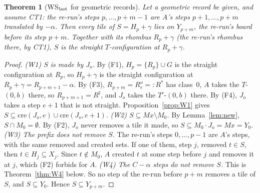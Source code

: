 \documentclass[11pt]{article}
\newtheorem{theorem}{Theorem}\newtheorem{lemma}[theorem]{Lemma}\newtheorem{proposition}[theorem]{Proposition}
\theoremstyle{definition}\newtheorem{definition}[theorem]{Definition}\newtheorem{remark}[theorem]{Remark}
\begin{document}
\begin{theorem}[WS$_{\rm last}$ for geometric records]\label{thm:wslast}
Let a geometric record be given, and assume \textup{CT1}: the re-run's steps $p,\dots,p+m-1$ are $A$'s steps $p+1,\dots,p+m$ translated by $-\alpha$. Then every tile of $S=H_p+\gamma$ lies on $Y_{p+m}$, the re-run's board before its step $p+m$. Together with its rhombus $R_p+\gamma$ (the re-run's rhombus there, by CT1), $S$ is the straight $T$-configuration at $R_p+\gamma$.
\end{theorem}
\begin{proof}
\emph{(W1) $S$ is made by $J_o$.} By (F1), $H_p=\{R_p\}\cup G$ is the straight configuration at $R_p$, so $H_p+\gamma$ is the straight configuration at $R_p+\gamma=R_{p+m+1}-\alpha$. By (F3), $R_{p+m}=R^o_e=:R^\ast$ has class~0, $A$ takes the $T$-$(0,b)$ there, so $R_{p+m+1}=R^\sharp$, and $J_o$ takes the $T'$-$(0,b)$ there. By (F4), $J_o$ takes a step $e+1$ that is not straight. Proposition~\ref{prop:W1} gives $S\subseteq\mathrm{cre}(J_o,e)\cup\mathrm{cre}(J_o,e+1)$.
\emph{(W2) $S\subseteq Mx\setminus M_0$.} By Lemma~\ref{lem:new}, $S\cap M_0=\emptyset$. By (F2), $J_o$ never removes a tile it made, so $S\subseteq M_0\cdot J_o=Mx=Y_0$.
\emph{(W3) The prefix does not remove $S$.} The re-run's steps $0,\dots,p-1$ are $A$'s steps, with the same removed and created sets. If one of them, step $j$, removed $t\in S$, then $t\in H_j\subseteq X_j$. Since $t\notin M_0$, $A$ created $t$ at some step before $j$ and removes it at $j$, which (F2) forbids for $A$.
\emph{(W4) The $C-\alpha$ steps do not remove $S$.} This is Theorem~\ref{thm:W4} below.
So no step of the re-run before $p+m$ removes a tile of $S$, and $S\subseteq Y_0$. Hence $S\subseteq Y_{p+m}$.
\end{proof}
\end{document}
